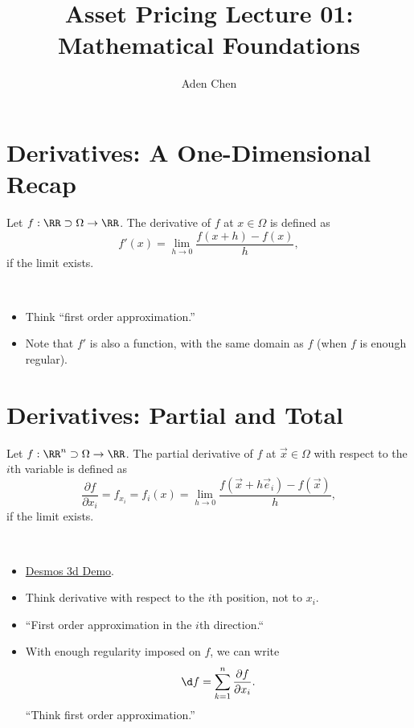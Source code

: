 \documentclass[oneside,reqno,letterpaper]{amsart}
\title[AP-Lec01]{Asset Pricing Lecture 01: Mathematical Foundations}
\author{Aden Chen}
\begin{document}
\maketitle

\tableofcontents

\section{Derivatives: A One-Dimensional Recap}

\begin{definition}
  Let \(f: \RR \supset \Omega \to \RR\). 
  The derivative of \(f\) at \(x \in \Omega\) is defined as 
  \[
    f'(x) = \lim_{h \to 0} \frac{f(x + h) - f(x)}{h} , 
  \] 
  if the limit exists. 
\end{definition}
\begin{remark}~
  \begin{itemize}
    \item Think ``first order approximation.''
    \item Note that \(f'\) is also a function, with the same domain as \(f\) (when \(f\) is enough regular). 
  \end{itemize}
\end{remark}



\section{Derivatives: Partial and Total}
\begin{definition}
  Let \(f: \RR^n \supset \Omega \to \RR\). 
  The partial derivative of \(f\) at \(\vec{x} \in \Omega\) with respect to the \(i\)th variable is defined as 
  \[
    \frac{\partial f}{\partial x_i}
    = f_{x_i}
    = f_i(x) 
    = \lim_{h \to 0} \frac{f(\vec{x} + h \vec{e}_i) - f(\vec{x})}{h} , 
  \] 
  if the limit exists. 
\end{definition}
\begin{remark}~
  \begin{itemize}
    \item \href{https://www.desmos.com/3d/qvhgjqbkax}{Desmos 3d Demo}. 
    \item Think derivative with respect to the \(i\)th position, not to \(x_i\). 
    \item ``First order approximation in the \(i\)th direction.``
    \item With enough regularity imposed on \(f\), we can write 
      \[
        \d f = \sum_{k = 1}^{n} \frac{\partial f}{\partial x_i} . 
      \] 
      ``Think first order approximation.''
  \end{itemize}
\end{remark}
\end{document}
